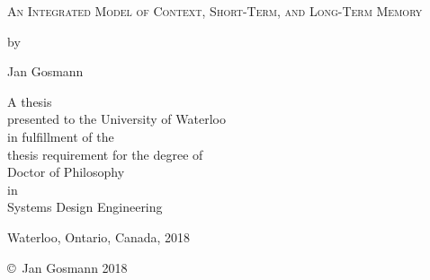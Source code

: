
\begin{titlepage}
        \begin{center}
        \vspace*{1.0cm}

        \Huge
        {\textsc{An Integrated Model of Context, Short-Term, and Long-Term Memory}}

        \vspace*{1.0cm}

        \normalsize
        by \\

        \vspace*{1.0cm}

        \Large
        Jan Gosmann \\

        \vspace*{3.0cm}

        \normalsize
        A thesis \\
        presented to the University of Waterloo \\ 
        in fulfillment of the \\
        thesis requirement for the degree of \\
        Doctor of Philosophy \\
        in \\
        Systems Design Engineering \\

        \vspace*{2.0cm}

        Waterloo, Ontario, Canada, 2018 \\

        \vspace*{1.0cm}

        \copyright\ Jan Gosmann 2018 \\
        \end{center}
\end{titlepage}

\pagestyle{plain}
\setcounter{page}{2}

\cleardoublepage %
 


